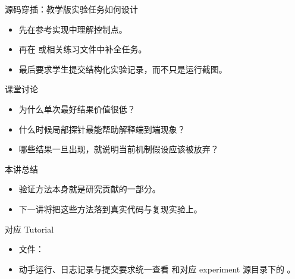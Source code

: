 \begin{frame}{源码穿插：教学版实验任务如何设计}
  \begin{itemize}
    \item 先在参考实现中理解控制点。
    \item 再在 \texttt{} 或相关练习文件中补全任务。
    \item 最后要求学生提交结构化实验记录，而不只是运行截图。
  \end{itemize}
\end{frame}



\begin{frame}{课堂讨论}
  \begin{itemize}
    \item 为什么单次最好结果价值很低？
    \item 什么时候局部探针最能帮助解释端到端现象？
    \item 哪些结果一旦出现，就说明当前机制假设应该被放弃？
  \end{itemize}
\end{frame}

\begin{frame}{本讲总结}
  \begin{itemize}
    \item 验证方法本身就是研究贡献的一部分。
    \item 下一讲将把这些方法落到真实代码与复现实验上。
  \end{itemize}
\end{frame}

\LectureElevenSources

\begin{frame}{对应 Tutorial}
  \begin{itemize}
    \item 文件：\texttt{}
    \item 动手运行、日志记录与提交要求统一查看 \texttt{} 和对应 experiment 源目录下的 \texttt{}。
  \end{itemize}
\end{frame}


